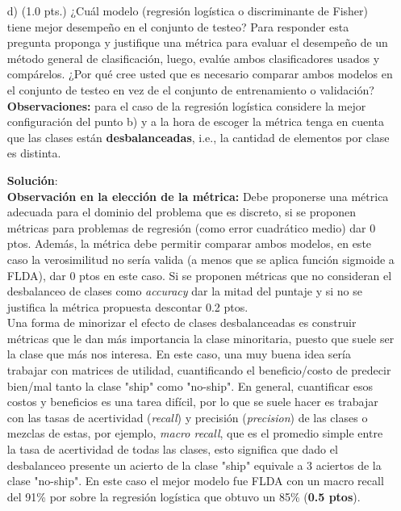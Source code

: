 \documentclass[11pt,letterpaper]{article}
\begin{document}
\begin{enumerate}
\item[d)] (1.0 pts.) ¿Cuál modelo (regresión logística o  discriminante de Fisher) tiene mejor desempeño en el conjunto de testeo? Para responder esta pregunta proponga y justifique una métrica para evaluar el desempeño de un método general de clasificación, luego, evalúe ambos clasificadores usados y compárelos. ¿Por qué cree usted que es necesario comparar ambos modelos en el conjunto de testeo en vez de el conjunto de entrenamiento o validación?
\\\textbf{Observaciones:} para el caso de la regresión logística considere la mejor configuración del punto b) y a la hora de escoger la métrica tenga en cuenta que las clases están \textbf{desbalanceadas}, i.e., la cantidad de elementos por clase es distinta.

\textbf{Solución}:\\

\textbf{Observación en la elección de la métrica:} Debe proponerse una métrica adecuada para el dominio del problema que es discreto, si se proponen métricas para problemas de regresión (como error cuadrático medio) dar 0 ptos. Además, la métrica debe permitir comparar ambos modelos, en este caso la verosimilitud no sería valida (a menos que se aplica función sigmoide a FLDA), dar 0 ptos en este caso. Si se proponen métricas que no consideran el desbalanceo de clases como \textit{accuracy} dar la mitad del puntaje y si no se justifica la métrica propuesta descontar 0.2 ptos.\\ 

Una forma de minorizar el efecto de clases desbalanceadas es construir métricas que le dan más importancia la clase minoritaria, puesto que suele ser la clase que más nos interesa. En este caso, una muy buena idea sería trabajar con matrices de utilidad, cuantificando el beneficio/costo de predecir bien/mal tanto la clase "ship" como "no-ship". En general, cuantificar esos costos y beneficios es una tarea difícil, por lo que se suele hacer es trabajar con las tasas de acertividad (\textit{recall}) y precisión (\textit{precision}) de las clases o mezclas de estas, por ejemplo, \textit{macro recall}, que es el promedio simple entre la tasa de acertividad de todas las clases, esto significa que dado el desbalanceo presente un acierto de la clase "ship" equivale a 3 aciertos de la clase "no-ship". En este caso el mejor modelo fue FLDA con un macro recall del 91\% por sobre la regresión logística que obtuvo un 85\% (\textbf{0.5 ptos}). \\


\end{enumerate}
\end{document}
